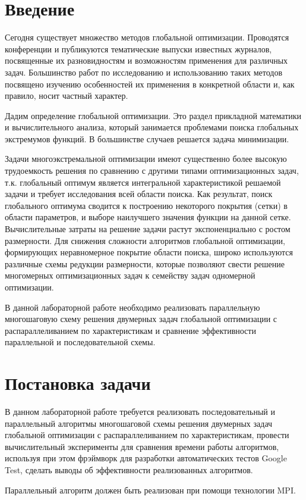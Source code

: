 \documentclass{report}
\begin{document}
\setcounter{page}{2}

\tableofcontents
\newpage

\section*{Введение}
\par Сегодня существует множество методов глобальной оптимизации. Проводятся конференции и публикуются тематические выпуски известных журналов, посвященные их разновидностям и возможностям применения для различных задач. Большинство работ по исследованию и использованию таких методов посвящено изучению особенностей их применения в конкретной области и, как правило, носит частный характер.
\par Дадим определение глобальной оптимизации. Это раздел прикладной математики и вычислительного анализа, который занимается проблемами поиска глобальных экстремумов функций. В большинстве случаев решается задача минимизации.
\par Задачи многоэкстремальной оптимизации имеют существенно более высокую трудоемкость решения по сравнению с другими типами оптимизационных задач, т.к. глобальный оптимум является интегральной характеристикой решаемой задачи и требует исследования всей области поиска. Как результат, поиск глобального оптимума сводится к построению некоторого покрытия (сетки) в области параметров, и выборе наилучшего значения функции на данной сетке. Вычислительные затраты на решение задачи растут экспоненциально с ростом размерности. Для снижения сложности алгоритмов глобальной оптимизации, формирующих неравномерное покрытие области поиска, широко используются различные схемы редукции размерности, которые позволяют свести решение многомерных оптимизационных задач к семейству задач одномерной оптимизации.
\par В данной лабораторной работе необходимо реализовать параллельную многошаговую схему решения двумерных задач глобальной оптимизации с распараллеливанием по характеристикам и сравнение эффективности параллельной и последовательной схемы.
\newpage

\section*{Постановка задачи}
\par В данном лабораторной работе требуется реализовать последовательный и параллельный алгоритмы многошаговой схемы решения двумерных задач глобальной оптимизации с распараллеливанием по характеристикам, провести вычислительный эксперименты для сравнения времени работы алгоритмов, используя при этом фрэймворк для разработки автоматических тестов Google Test, сделать выводы об эффективности реализованных алгоритмов.
\par Параллельный алгоритм должен быть реализован при помощи технологии MPI.
\newpage
\end{document}
